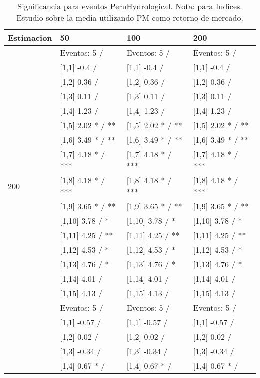 \begin{table}

\caption{Significancia para eventos PeruHydrological. Nota: para Indices. Estudio sobre la media utilizando PM como retorno de mercado.}
\centering
\begin{tabular}[t]{llll}
\toprule
Estimacion & 50 & 100 & 200\\
\midrule
 & Eventos:  5 / & Eventos:  5 / & Eventos:  5 /\\
 & {}[1,1] -0.4  / & {}[1,1] -0.4  / & {}[1,1] -0.4  /\\
 & {}[1,2] 0.36  / & {}[1,2] 0.36  / & {}[1,2] 0.36  /\\
 & {}[1,3] 0.11  / & {}[1,3] 0.11  / & {}[1,3] 0.11  /\\
 & {}[1,4] 1.23  / & {}[1,4] 1.23  / & {}[1,4] 1.23  /\\
\addlinespace
 & {}[1,5] 2.02 * / ** & {}[1,5] 2.02 * / ** & {}[1,5] 2.02 * / **\\
 & {}[1,6] 3.49 * / ** & {}[1,6] 3.49 * / ** & {}[1,6] 3.49 * / **\\
 & {}[1,7] 4.18 * / *** & {}[1,7] 4.18 * / *** & {}[1,7] 4.18 * / ***\\
200 & {}[1,8] 4.18 * / *** & {}[1,8] 4.18 * / *** & {}[1,8] 4.18 * / ***\\
 & {}[1,9] 3.65 * / ** & {}[1,9] 3.65 * / ** & {}[1,9] 3.65 * / **\\
\addlinespace
 & {}[1,10] 3.78  / * & {}[1,10] 3.78  / * & {}[1,10] 3.78  / *\\
 & {}[1,11] 4.25  / ** & {}[1,11] 4.25  / ** & {}[1,11] 4.25  / **\\
 & {}[1,12] 4.53  / * & {}[1,12] 4.53  / * & {}[1,12] 4.53  / *\\
 & {}[1,13] 4.76  / * & {}[1,13] 4.76  / * & {}[1,13] 4.76  / *\\
 & {}[1,14] 4.01  / & {}[1,14] 4.01  / & {}[1,14] 4.01  /\\
\addlinespace
 & {}[1,15] 4.13  / & {}[1,15] 4.13  / & {}[1,15] 4.13  /\\
 & Eventos:  5 / & Eventos:  5 / & Eventos:  5 /\\
 & {}[1,1] -0.57  / & {}[1,1] -0.57  / & {}[1,1] -0.57  /\\
 & {}[1,2] 0.02  / & {}[1,2] 0.02  / & {}[1,2] 0.02  /\\
 & {}[1,3] -0.34  / & {}[1,3] -0.34  / & {}[1,3] -0.34  /\\
\addlinespace
 & {}[1,4] 0.67 * / & {}[1,4] 0.67 * / & {}[1,4] 0.67 * /\\

\end{tabular}
\end{table}
